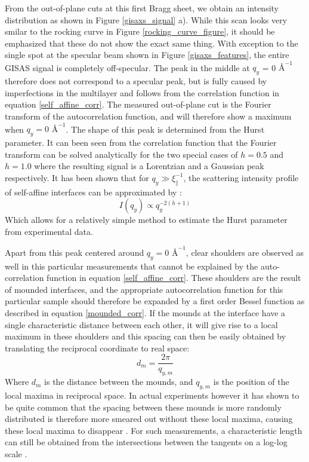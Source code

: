 From the out-of-plane cuts at this first Bragg sheet, we obtain an intensity distribution as shown in Figure \ref{gisaxs_signal} a). While this scan looks very smilar to the rocking curve in Figure \ref{rocking_curve_figure}, it should be emphasized that these do not show the exact same thing. With exception to the single spot at the specular beam shown in Figure \ref{gisaxs_features}, the entire GISAS signal is completely off-specular. The peak in the middle at $q_y$ = 0 $Å^{-1}$ therefore does not correspond to a specular peak, but is fully caused by imperfections in the multilayer and follows from the correlation function in equation \ref{self_affine_corr}. The measured out-of-plane cut is the Fourier transform of the autocorrelation function, and will therefore show a maximum when $q_y = 0$ $Å^{-1}$. The shape of this peak is determined from the Hurst parameter. It can been seen from the correlation function that the Fourier transform can be solved analytically for the two special cases of $h = 0.5$ and $h = 1.0$ where the resulting signal is a Lorentzian and a Gaussian peak respectively. It has been shown that for $q_y \gg \xi_{\parallel}^{-1}$, the scattering intensity profile of self-affine interfaces can be approximated by \cite{determine_hurst}: 
\begin{equation}
	I(q_y) \propto q_y^{-2(h+1)}
\end{equation}
Which allows for a relatively simple method to estimate the Hurst parameter from experimental data.

Apart from this peak centered around $q_y = 0$ $Å^{-1}$, clear shoulders are observed as well in this particular measurements that cannot be explained by the auto-correlation function in equation \ref{self_affine_corr}. These shoulders are the result of mounded interfaces, and the appropriate autocorrelation function for this particular sample should therefore be expanded by a first order Bessel function as described in equation \ref{mounded_corr}. If the mounds at the interface have a single characteristic distance between each other, it will give rise to a local maximum in these shoulders and this spacing can then be easily obtained by translating the reciprocal coordinate to real space:
\begin{equation}
	d_m = \frac{2\pi}{q_{y,m}}
\end{equation}
Where $d_m$ is the distance between the mounds, and $q_{y,m}$ is the position of the local maxima in reciprocal space. In actual experiments however it has shown to be quite common that the spacing between these mounds is more randomly distributed is therefore more smeared out without these local maxima, causing these local maxima to disappear \cite{zhao2000characterization}. For such measurements, a characteristic length can still be obtained from the intersections between the tangents on a log-log scale \cite{char_length}. 

